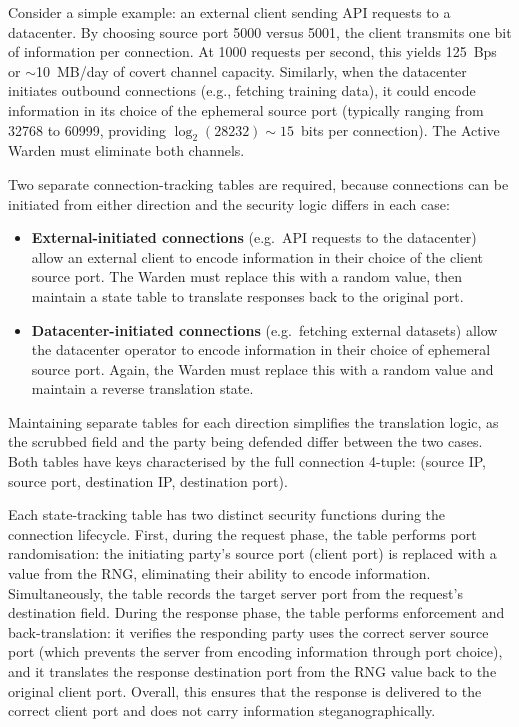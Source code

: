 \documentclass{article}
\begin{document}
Consider a simple example: an external client sending API requests to a datacenter. By choosing source port 5000 versus 5001, the client transmits one bit of information per connection. At 1000 requests per second, this yields 125~Bps or $\sim$10~MB/day of covert channel capacity. Similarly, when the datacenter initiates outbound connections (e.g., fetching training data), it could encode information in its choice of the ephemeral source port (typically ranging from 32768 to 60999, providing $\log_2(28232) \sim 15$~bits per connection). The Active Warden must eliminate both channels.

Two separate connection-tracking tables are required, because connections can be initiated from either direction and the security logic differs in each case:

\begin{itemize}
\item \textbf{External-initiated connections} (e.g.\ API requests to the datacenter) allow an external client to encode information in their choice of the client source port. The Warden must replace this with a random value, then maintain a state table to translate responses back to the original port.
\item \textbf{Datacenter-initiated connections} (e.g.\ fetching external datasets) allow the datacenter operator to encode information in their choice of ephemeral source port. Again, the Warden must replace this with a random value and maintain a reverse translation state.
\end{itemize}

Maintaining separate tables for each direction simplifies the translation logic, as the scrubbed field and the party being defended differ between the two cases. Both tables have keys characterised by the full connection 4-tuple: (source IP, source port, destination IP, destination port).

Each state-tracking table has two distinct security functions during the connection lifecycle. First, during the request phase, the table performs port randomisation: the initiating party's source port (client port) is replaced with a value from the RNG, eliminating their ability to encode information. Simultaneously, the table records the target server port from the request's destination field. During the response phase, the table performs enforcement and back-translation: it verifies the responding party uses the correct server source port (which prevents the server from encoding information through port choice), and it translates the response destination port from the RNG value back to the original client port. Overall, this ensures that the response is delivered to the correct client port and does not carry information steganographically.
\end{document}
